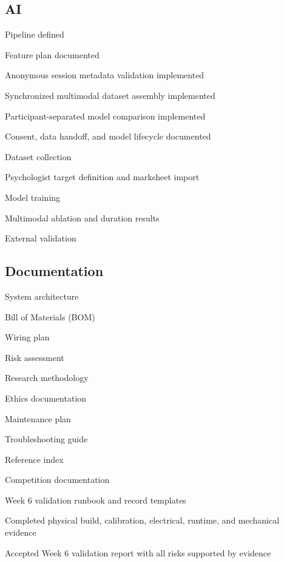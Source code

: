 \subsection{AI}
\label{sec:checklist-ai}

\begin{donelist}
    \item Pipeline defined
    \item Feature plan documented
    \item Anonymous session metadata validation implemented
    \item Synchronized multimodal dataset assembly implemented
    \item Participant-separated model comparison implemented
    \item Consent, data handoff, and model lifecycle documented
\end{donelist}
\begin{checklist}
    \item Dataset collection
    \item Psychologist target definition and marksheet import
    \item Model training
    \item Multimodal ablation and duration results
    \item External validation
\end{checklist}

\subsection{Documentation}
\label{sec:checklist-documentation}

\begin{donelist}
    \item System architecture
    \item Bill of Materials (BOM)
    \item Wiring plan
    \item Risk assessment
    \item Research methodology
    \item Ethics documentation
    \item Maintenance plan
    \item Troubleshooting guide
    \item Reference index
    \item Competition documentation
    \item Week 6 validation runbook and record templates
\end{donelist}
\begin{checklist}
    \item Completed physical build, calibration, electrical, runtime, and mechanical evidence
    \item Accepted Week 6 validation report with all risks supported by evidence
\end{checklist}
